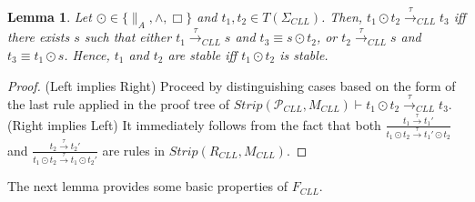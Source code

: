 \documentclass{elsarticle}
\theoremstyle{plain}
\newtheorem{lemma}[theorem]{Lemma}
\theoremstyle{definition}
\begin{document}
\begin{lemma}\label{L:STABILIZATION}
Let $\odot \in \{\parallel_A,\wedge,\Box\}$ and $t_1,t_2\in T(\Sigma_{CLL})$.
Then, $t_1\odot t_2 \stackrel{\tau}{\longrightarrow}_{CLL}t_3$ iff there exists $s$ such that either $t_1 \stackrel{\tau}{\longrightarrow}_{CLL}s$ and $t_3\equiv s\odot t_2$, or $t_2 \stackrel{\tau}{\longrightarrow}_{CLL}s$ and $t_3\equiv t_1\odot s$.
Hence, $t_1$ and $t_2$ are stable iff $t_1 \odot t_2$ is stable.
\end{lemma}
\begin{proof}
(Left implies Right) Proceed by distinguishing cases based on the form of the last rule applied in the proof tree of $Strip({\mathcal P}_{CLL},M_{CLL})\vdash t_1\odot t_2 \stackrel{\tau}{\longrightarrow}_{CLL}t_3$.\\

\noindent (Right implies Left) It immediately follows from the fact that both $\frac{t_1 \stackrel{\tau}{\longrightarrow}t_1'}{t_1\odot t_2 \stackrel{\tau}{\longrightarrow} t_1' \odot t_2}$ and $\frac{t_2 \stackrel{\tau}{\longrightarrow}t_2'}{t_1\odot t_2 \stackrel{\tau}{\longrightarrow} t_1 \odot t_2'}$ are rules in $Strip(R_{CLL},M_{CLL})$.
\end{proof}

The next lemma provides some basic properties of $F_{CLL}$.
\end{document}
